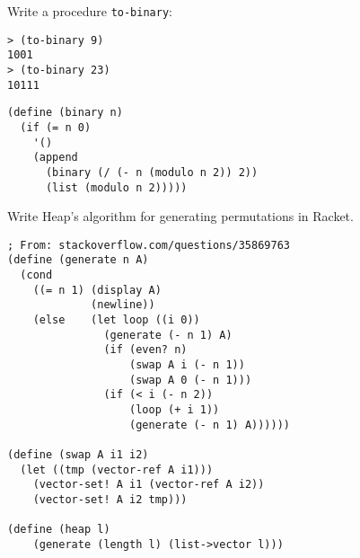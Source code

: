 \documentclass[addpoints,12pt,a4paper]{exam}
\begin{document}
\begin{questions}
\question
Write a procedure \texttt{to-binary}:
\begin{verbatim}
> (to-binary 9)
1001
> (to-binary 23)
10111
\end{verbatim}

\begin{solution}
  \begin{verbatim}
(define (binary n)
  (if (= n 0)
    '()
    (append
      (binary (/ (- n (modulo n 2)) 2))
      (list (modulo n 2)))))
  \end{verbatim}
\end{solution}

\question
Write Heap's algorithm for generating permutations in Racket.

\begin{solution}
  \begin{verbatim}
; From: stackoverflow.com/questions/35869763
(define (generate n A)
  (cond
    ((= n 1) (display A)
             (newline))
    (else    (let loop ((i 0))
               (generate (- n 1) A)
               (if (even? n)
                   (swap A i (- n 1))
                   (swap A 0 (- n 1)))
               (if (< i (- n 2))
                   (loop (+ i 1))
                   (generate (- n 1) A))))))

(define (swap A i1 i2)
  (let ((tmp (vector-ref A i1)))
    (vector-set! A i1 (vector-ref A i2))
    (vector-set! A i2 tmp)))

(define (heap l)
	(generate (length l) (list->vector l)))
  \end{verbatim}
\end{solution}

\end{questions}



\end{document}
